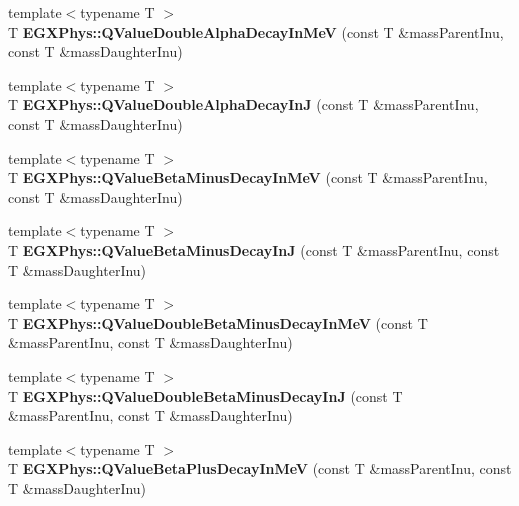 \begin{DoxyCompactItemize}
{\footnotesize template$<$typename T $>$ }\\T {\bfseries E\+G\+X\+Phys\+::\+Q\+Value\+Double\+Alpha\+Decay\+In\+MeV} (const T \&mass\+Parent\+Inu, const T \&mass\+Daughter\+Inu)
\item 
\mbox{\label{group___q_value_gaefd0ecd4ae3166d18a4748ff540e6bfc}} 
{\footnotesize template$<$typename T $>$ }\\T {\bfseries E\+G\+X\+Phys\+::\+Q\+Value\+Double\+Alpha\+Decay\+InJ} (const T \&mass\+Parent\+Inu, const T \&mass\+Daughter\+Inu)
\item 
\mbox{\label{group___q_value_ga42468e998cf58a027a676755aa1339ba}} 
{\footnotesize template$<$typename T $>$ }\\T {\bfseries E\+G\+X\+Phys\+::\+Q\+Value\+Beta\+Minus\+Decay\+In\+MeV} (const T \&mass\+Parent\+Inu, const T \&mass\+Daughter\+Inu)
\item 
\mbox{\label{group___q_value_ga4a2ab24ffb317abc97ce46c92bb64c3c}} 
{\footnotesize template$<$typename T $>$ }\\T {\bfseries E\+G\+X\+Phys\+::\+Q\+Value\+Beta\+Minus\+Decay\+InJ} (const T \&mass\+Parent\+Inu, const T \&mass\+Daughter\+Inu)
\item 
\mbox{\label{group___q_value_ga0eefdd84aa89d210e00dca043368dfeb}} 
{\footnotesize template$<$typename T $>$ }\\T {\bfseries E\+G\+X\+Phys\+::\+Q\+Value\+Double\+Beta\+Minus\+Decay\+In\+MeV} (const T \&mass\+Parent\+Inu, const T \&mass\+Daughter\+Inu)
\item 
\mbox{\label{group___q_value_gaf19d189152aec04d8b1ebbbe8792540b}} 
{\footnotesize template$<$typename T $>$ }\\T {\bfseries E\+G\+X\+Phys\+::\+Q\+Value\+Double\+Beta\+Minus\+Decay\+InJ} (const T \&mass\+Parent\+Inu, const T \&mass\+Daughter\+Inu)
\item 
\mbox{\label{group___q_value_ga9bf549cd4f8e1c76e9cc41b72d4f0279}} 
{\footnotesize template$<$typename T $>$ }\\T {\bfseries E\+G\+X\+Phys\+::\+Q\+Value\+Beta\+Plus\+Decay\+In\+MeV} (const T \&mass\+Parent\+Inu, const T \&mass\+Daughter\+Inu)
\item 

\end{DoxyCompactItemize}
